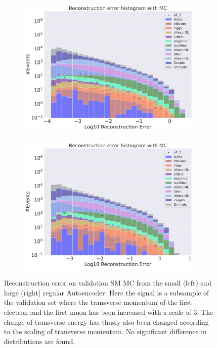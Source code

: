 \begin{figure}[h!]
    \centering
    \begin{subfigure}{.45\textwidth}
        \includegraphics[width=\textwidth]{Figures/AE_testing/small/b_data_recon_big_rm3_feats_sig_pT_3.pdf}
        \caption{}
        \label{fig:ae_small_pt_3}
    \end{subfigure}
    \hfill 
    \begin{subfigure}{.45\textwidth}
        \includegraphics[width=\textwidth]{Figures/AE_testing/big/b_data_recon_big_rm3_feats_sig_pT_3.pdf}
        \caption{}
        \label{fig:ae_big_pt_3}
    \end{subfigure}
    \hfill 
    \caption[AE | Reconstruction error $p_T$ altering of 3]{Reconstruction error on validation SM MC from the small (left) and large (right) regular Autoencoder. Here the signal is a subsample of the validation 
    set where the transverse momentum of the first electron and the first muon has been increased with a scale of $3$. The change of transverse 
    energy has thusly also been changed according to the scaling of transverse momentum. No significant difference in distributions are found.  }
    \label{fig:ae_big_small_pt_3}
\end{figure}

